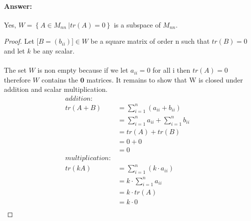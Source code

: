 \documentclass[12pt]{article}
\begin{document}
\begin{enumerate}
\begin{enumerate}
                            \paragraph{Answer:} Yes, $W={ \left\{A \in M_{nn} \ |
                                    tr(A) = 0 \right\}}$ is a subspace of $M_{nn}$.
                            \begin{proof}
                                    Let [$B = ({b_{ii}})]\in W$ be a square matrix of order n such that $tr(B)=0$ and let ${k}$ be any scalar.\\\\
                                    The set $W$ is non empty because if we let ${a_{ii}=0}$
                                    for all i then $tr(A)=0$ therefore $W$ contains the $\mathbf{0}$ matrices.
                                    It remains to show that W is closed under addition and scalar multiplication.
                                    \begin{align*}
                                            addition:       &                                                   \\
                                            tr(A+B)         & = \sum_{i = 1}^{n}(a_{ii}+b_{ii})                 \\
                                                            & = \sum_{i = 1}^{n}a_{ii} + \sum_{i = 1}^{n}b_{ii} \\
                                                            & = tr(A) + tr(B)                                   \\
                                                            & = 0 + 0                                           \\
                                                            & = 0                                               \\
                                            multiplication: &                                                   \\
                                            tr(kA)          & = \sum_{i = 1}^{n}(k\cdot a_{ii})                 \\
                                                            & = k\cdot \sum_{i = 1}^{n}a_{ii}                   \\
                                                            & = k\cdot tr(A)                                    \\
                                                            & = k\cdot 0                                        \\

\end{align*}
\end{proof}
\end{enumerate}
\end{enumerate}
\end{document}
